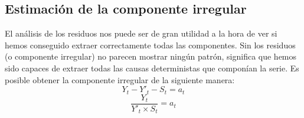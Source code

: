 \subsection{Estimación de la componente irregular}
El análisis de los residuos nos puede ser de gran utilidad a la hora de ver si hemos conseguido extraer correctamente todas las componentes. Sin los residuos (o componente irregular) no parecen mostrar ningún patrón, significa que hemos sido capaces de extraer todas las causas deterministas que componían la serie. Es posible obtener la componente irregular de la siguiente manera:
\begin{equation}
    Y_t - Y'_t - S_t = a_t
\end{equation}
\begin{equation}
    \frac{Y_t}{Y'_t \times S_t} = a_t
\end{equation}

